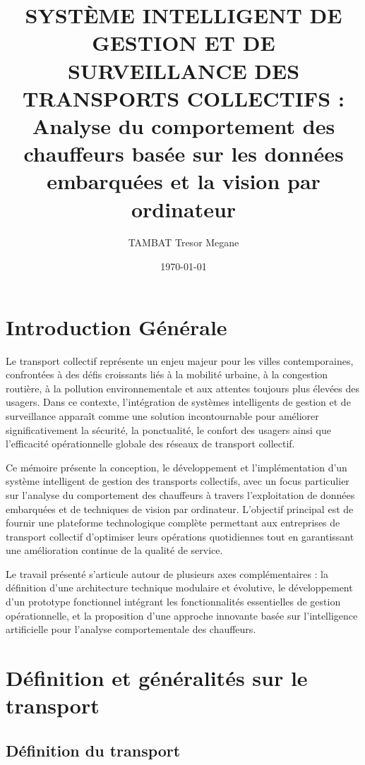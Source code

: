 \documentclass[a4paper, 12pt]{book}
\title{SYSTÈME INTELLIGENT DE GESTION ET DE SURVEILLANCE DES TRANSPORTS COLLECTIFS :\\Analyse du comportement des chauffeurs basée sur les données embarquées et la vision par ordinateur}
\author{TAMBAT Tresor Megane}
\date{\today}
\begin{document}
\maketitle

\tableofcontents
\listoffigures
\listoftables

\chapter*{Introduction Générale}

Le transport collectif représente un enjeu majeur pour les villes contemporaines, confrontées à des défis croissants liés à la mobilité urbaine, à la congestion routière, à la pollution environnementale et aux attentes toujours plus élevées des usagers. Dans ce contexte, l'intégration de systèmes intelligents de gestion et de surveillance apparaît comme une solution incontournable pour améliorer significativement la sécurité, la ponctualité, le confort des usagers ainsi que l'efficacité opérationnelle globale des réseaux de transport collectif.

Ce mémoire présente la conception, le développement et l'implémentation d'un système intelligent de gestion des transports collectifs, avec un focus particulier sur l'analyse du comportement des chauffeurs à travers l'exploitation de données embarquées et de techniques de vision par ordinateur. L'objectif principal est de fournir une plateforme technologique complète permettant aux entreprises de transport collectif d'optimiser leurs opérations quotidiennes tout en garantissant une amélioration continue de la qualité de service.

Le travail présenté s'articule autour de plusieurs axes complémentaires : la définition d'une architecture technique modulaire et évolutive, le développement d'un prototype fonctionnel intégrant les fonctionnalités essentielles de gestion opérationnelle, et la proposition d'une approche innovante basée sur l'intelligence artificielle pour l'analyse comportementale des chauffeurs.

\newpage

\chapter{Définition et généralités sur le transport}

\section{Définition du transport}
\end{document}
